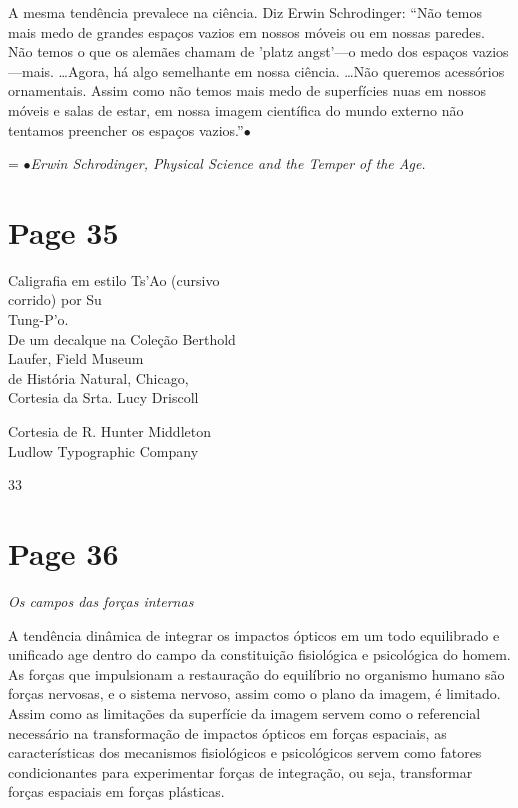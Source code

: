 \documentclass[a4paper]{article}
\begin{document}
\par

A mesma tendência prevalece na ciência. Diz Erwin Schrodinger:
``Não temos mais medo de grandes espaços vazios em nossos móveis ou em nossas paredes. Não temos o que os alemães chamam de 'platz angst'---o medo dos espaços vazios---mais. \ldots Agora, há algo semelhante em nossa ciência. \ldots Não queremos acessórios ornamentais. Assim como não temos mais medo de superfícies nuas em nossos móveis e salas de estar, em nossa imagem científica do mundo externo não tentamos preencher os espaços vazios.''$\bullet$

\par
{\leftskip=\parindent\relax
$\bullet$\textit{Erwin Schrodinger, Physical Science and the Temper of the Age.}
}

\par
{}

\newpage
\section*{Page 35}

Caligrafia em estilo Ts'Ao (cursivo\\
corrido) por Su\\
Tung-P'o.\\
De um decalque na Coleção Berthold\\
Laufer, Field Museum\\
de História Natural, Chicago,\\
Cortesia da Srta. Lucy Driscoll

Cortesia de R. Hunter Middleton\\
Ludlow Typographic Company

33

\newpage
\section*{Page 36}

\raggedright

\textit{Os campos das forças internas}

A tendência dinâmica de integrar os impactos ópticos em um todo equilibrado e unificado age dentro do campo da constituição fisiológica e psicológica do homem. As forças que impulsionam a restauração do equilíbrio no organismo humano são forças nervosas, e o sistema nervoso, assim como o plano da imagem, é limitado. Assim como as limitações da superfície da imagem servem como o referencial necessário na transformação de impactos ópticos em forças espaciais, as características dos mecanismos fisiológicos e psicológicos servem como fatores condicionantes para experimentar forças de integração, ou seja, transformar forças espaciais em forças plásticas.
\end{document}
